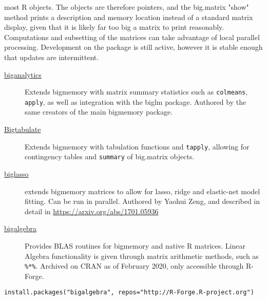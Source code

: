 \documentclass[a4paper, 11pt]{article}
\begin{document}
\begin{description}
most R objects. The objects are therefore pointers, and the
big.matrix "show" method prints a description and memory location
instead of a standard matrix display, given that it is likely far
too big a matrix to print reasonably. Computations and subsetting
of the matrices can take advantage of local parallel processing.
Development on the package is still active, however it is stable
enough that updates are intermittent.
\begin{description}
\item[{\href{https://cran.r-project.org/web/packages/biganalytics/index.html}{biganalytics}}] Extends bigmemory with matrix summary statistics
such as \texttt{colmeans}, \texttt{apply}, as well as integration with the
biglm package. Authored by the same creators of the main
bigmemory package.
\item[{\href{http://www.bigmemory.org}{Bigtabulate}}] Extends bigmemory with tabulation functions and
\texttt{tapply}, allowing for contingency tables and \texttt{summary} of
big.matrix objects.
\item[{\href{https://github.com/YaohuiZeng/biglasso}{biglasso}}] extends bigmemory matrices to allow for lasso, ridge
and elastic-net model fitting. Can be run in parallel. Authored
by Yaohui Zeng, and described in detail in
\url{https://arxiv.org/abs/1701.05936}
\item[{\href{http://www.bigmemory.org}{bigalgebra}}] Provides BLAS routines for bigmemory and native R
matrices. Linear Algebra functionality is given through matrix
arithmetic methods, such as \texttt{\%*\%}. Archived on CRAN as of
February 2020, only accessible through R-Forge.
\end{description}
\end{description}
\begin{verbatim}
install.packages("bigalgebra", repos="http://R-Forge.R-project.org")
\end{verbatim}
\end{document}
